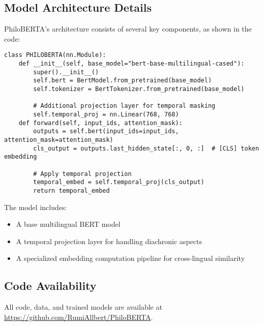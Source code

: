 \documentclass[11pt]{article} %
\begin{document}
\subsection{Model Architecture Details}

PhiloBERTA's architecture consists of several key components, as shown in the code:

\begin{lstlisting}[style=python]
class PHILOBERTA(nn.Module):
    def __init__(self, base_model="bert-base-multilingual-cased"):
        super().__init__()
        self.bert = BertModel.from_pretrained(base_model)
        self.tokenizer = BertTokenizer.from_pretrained(base_model)

        # Additional projection layer for temporal masking
        self.temporal_proj = nn.Linear(768, 768)
    def forward(self, input_ids, attention_mask):
        outputs = self.bert(input_ids=input_ids, attention_mask=attention_mask)
        cls_output = outputs.last_hidden_state[:, 0, :]  # [CLS] token embedding

        # Apply temporal projection
        temporal_embed = self.temporal_proj(cls_output)
        return temporal_embed
\end{lstlisting}

The model includes:
\begin{itemize}
    \item A base multilingual BERT model
    \item A temporal projection layer for handling diachronic aspects
    \item A specialized embedding computation pipeline for cross-lingual similarity
\end{itemize}

\subsection{Code Availability}

All code, data, and trained models are available at \url{https://github.com/RumiAllbert/PhiloBERTA}.
\end{document}
